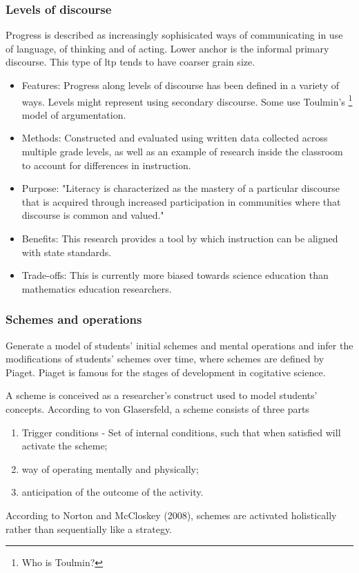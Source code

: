 \documentclass{TC}
\begin{document}
\subsubsection{Levels of discourse}

Progress is described as increasingly sophisicated ways of communicating in use of language, of thinking and of acting. Lower anchor is the informal primary discourse. This type of \gls{ltp} tends to have coarser grain size.

\begin{multicols}{2}
\begin{itemize} 
\item Features: Progress along levels of discourse has been defined in a variety of ways. Levels might represent using secondary discourse. Some use Toulmin's \footnote{Who is Toulmin?} model of argumentation.
\item Methods: Constructed and evaluated using written data collected across multiple grade levels, as well as an example of research inside the classroom to account for differences in instruction. 
\item Purpose: "Literacy is characterized as the mastery of a particular discourse that is acquired through increased participation in communities where that discourse is common and valued." 
\item Benefits: This research provides a tool by which instruction can be aligned with state standards. 
\item Trade-offs: This is currently more biased towards science education than mathematics education researchers. 
 \end{itemize}
 \end{multicols}
 
 
\subsubsection{Schemes and operations}

 Generate a model of students' initial schemes and mental operations and infer the modifications of students' schemes over time, where schemes are defined by Piaget. Piaget is famous for the stages of development in cogitative science.
\begin{mdframed}
\begin{definition}[Scheme]
A scheme is conceived as a researcher's construct used to model students' concepts.
According to von Glasersfeld, a scheme consists of three parts
\begin{enumerate}[(1)]
\item Trigger conditions - Set of internal conditions, such that when satisfied will activate the scheme;
\item way of operating mentally and physically;
\item anticipation of the outcome of the activity.
\end{enumerate}
According to Norton and McCloskey (2008), schemes are activated holistically rather than sequentially like a strategy. 
\end{definition}
\end{mdframed}
\end{document}
